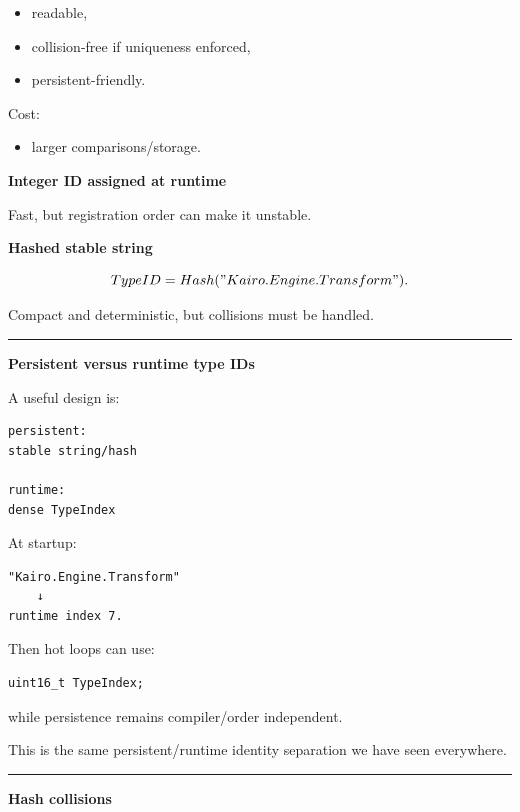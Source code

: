 \begin{itemize}
\tightlist
\item
  readable,
\item
  collision-free if uniqueness enforced,
\item
  persistent-friendly.
\end{itemize}

Cost:

\begin{itemize}
\tightlist
\item
  larger comparisons/storage.
\end{itemize}

\textbf{Integer ID assigned at runtime}

Fast, but registration order can make it unstable.

\textbf{Hashed stable string}

\[
TypeID=Hash("Kairo.Engine.Transform").
\]

Compact and deterministic, but collisions must be handled.

\begin{center}\rule{0.5\linewidth}{0.5pt}\end{center}

\textbf{Persistent versus runtime type IDs}

A useful design is:

\begin{verbatim}
persistent:
stable string/hash

runtime:
dense TypeIndex
\end{verbatim}

At startup:

\begin{verbatim}
"Kairo.Engine.Transform"
    ↓
runtime index 7.
\end{verbatim}

Then hot loops can use:

\begin{verbatim}
uint16_t TypeIndex;
\end{verbatim}

while persistence remains compiler/order independent.

This is the same persistent/runtime identity separation we have seen everywhere.

\begin{center}\rule{0.5\linewidth}{0.5pt}\end{center}

\textbf{Hash collisions}

